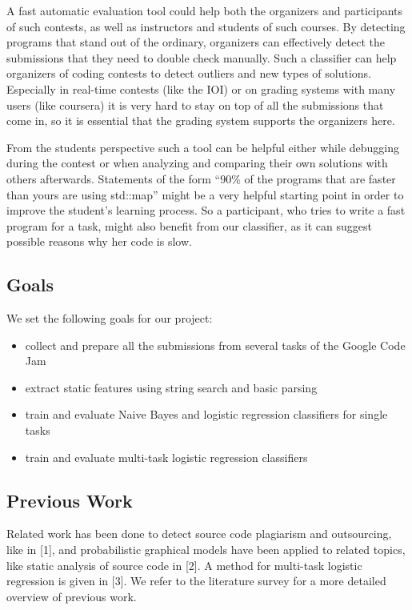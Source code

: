 A fast automatic evaluation tool could help both the organizers and participants of such contests, as well as instructors and students of such courses.
By detecting programs that stand out of the ordinary, organizers can effectively detect the submissions that they need to double check manually.
Such a classifier can help organizers of coding contests to detect outliers and new types of solutions. 
Especially in real-time contests (like the IOI) or on grading systems with many users (like coursera) it is very hard to stay on top of all the submissions that come in, so it is essential that the grading system supports the organizers here.

From the students perspective such a tool can be helpful either while debugging during the contest or when analyzing and comparing their own solutions with others afterwards. Statements of the form ``90\% of the programs that are faster than yours are using std::map'' might be a very helpful starting point in order to improve the student's learning process. So a participant, who tries to write a fast program for a task, might also benefit from our classifier, as it can suggest possible reasons why her code is slow.

\subsection*{Goals}
We set the following goals for our project:
\begin{itemize}
\item collect and prepare all the submissions from several tasks of the Google Code Jam
\item extract static features using string search and basic parsing
\item train and evaluate Naive Bayes and logistic regression classifiers for single tasks
\item train and evaluate multi-task logistic regression classifiers
\end{itemize}

\subsection*{Previous Work}
Related work has been done to detect source code plagiarism and outsourcing, like in [1], and probabilistic graphical models have been applied to related topics, like static analysis of source code in [2]. 
A method for multi-task logistic regression is given in [3].
We refer to the literature survey for a more detailed overview of previous work.
